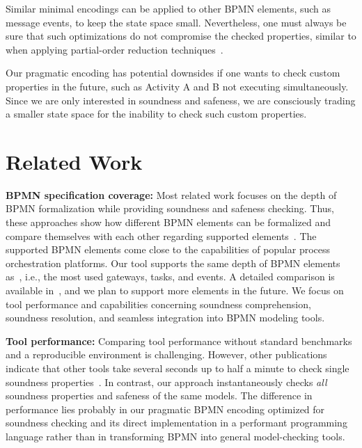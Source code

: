 \documentclass[runningheads]{llncs}
\begin{document}
Similar minimal encodings can be applied to other BPMN elements, such as message events, to keep the state space small.
Nevertheless, one must always be sure that such optimizations do not compromise the checked properties, similar to when applying partial-order reduction techniques~\cite{clarkeHandbookModelChecking2018}.

Our pragmatic encoding has potential downsides if one wants to check custom properties in the future, such as Activity A and B not executing simultaneously.
Since we are only interested in soundness and safeness, we are consciously trading a smaller state space for the inability to check such custom properties.

\section{Related Work} \label{sec:related-work}

\textbf{BPMN specification coverage:}
Most related work focuses on the depth of BPMN formalization while providing soundness and safeness checking.
Thus, these approaches show how different BPMN elements can be formalized and compare themselves with each other regarding supported elements~\cite{corradiniFormalApproachAnalysis2021,houhouFirstOrderLogicVerification2022,krauterFormalizationAnalysisBPMN2023,krauterHigherorderTransformationApproach2023}.
The supported BPMN elements come close to the capabilities of popular process orchestration platforms.
Our tool supports the same depth of BPMN elements as~\cite{corradiniFormalApproachAnalysis2021}, i.e., the most used gateways, tasks, and events.
A detailed comparison is available in~\cite{noauthorgivenBPM2024Artifacts2024}, and we plan to support more elements in the future.
We focus on tool performance and capabilities concerning soundness comprehension, soundness resolution, and seamless integration into BPMN modeling tools.

\textbf{Tool performance:}
Comparing tool performance without standard benchmarks and a reproducible environment is challenging.
However, other publications indicate that other tools take several seconds up to half a minute to check single soundness properties~\cite{corradiniFormalApproachAnalysis2021,houhouFirstOrderLogicVerification2022,krauterHigherorderTransformationApproach2023}.
In contrast, our approach instantaneously checks \textit{all} soundness properties and safeness of the same models.
The difference in performance lies probably in our pragmatic BPMN encoding optimized for soundness checking and its direct implementation in a performant programming language rather than in transforming BPMN into general model-checking tools.
\end{document}
